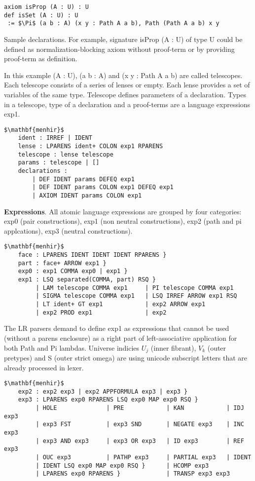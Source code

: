 \documentclass{article}
\theoremstyle{definition}
\begin{document}
\begin{lstlisting}[mathescape=true]
axiom isProp (A : U) : U
def isSet (A : U) : U
 := $\Pi$ (a b : A) (x y : Path A a b), Path (Path A a b) x y
\end{lstlisting}

Sample declarations. For example, signature isProp (A : U) of type U could be
defined as normalization-blocking axiom without proof-term or by providing proof-term as definition.

In this example (A : U), (a b : A) and (x y : Path A a b) are called telescopes.
Each telescope consists of a series of lenses or empty. Each lense provides a
set of variables of the same type. Telescope defines parameters of a declaration.
Types in a telescope, type of a declaration and a proof-terms are a language expressions exp1.

\begin{lstlisting}[mathescape=true]
$\mathbf{menhir}$
    ident : IRREF | IDENT
    lense : LPARENS ident+ COLON exp1 RPARENS
    telescope : lense telescope
    params : telescope | []
    declarations :
        | DEF IDENT params DEFEQ exp1
        | DEF IDENT params COLON exp1 DEFEQ exp1
        | AXIOM IDENT params COLON exp1
\end{lstlisting}

\textbf{Expressions}. All atomic language expressions are grouped by four categories:
exp0 (pair constructions), exp1 (non neutral constructions), exp2 (path and pi applcations),
exp3 (neutral constructions).

\begin{lstlisting}[mathescape=true]
$\mathbf{menhir}$
    face : LPARENS IDENT IDENT IDENT RPARENS }
    part : face+ ARROW exp1 }
    exp0 : exp1 COMMA exp0 | exp1 }
    exp1 : LSQ separated(COMMA, part) RSQ }
         | LAM telescope COMMA exp1     | PI telescope COMMA exp1
         | SIGMA telescope COMMA exp1   | LSQ IRREF ARROW exp1 RSQ
         | LT ident+ GT exp1            | exp2 ARROW exp1
         | exp2 PROD exp1               | exp2
\end{lstlisting}

The LR parsers demand to define exp1 as expressions that cannot be used (without a parens enclosure)
as a right part of left-associative application for both Path and Pi lambdas.
Universe indicies $U_j$ (inner fibrant), $V_k$ (outer pretypes) and S (outer strict omega)
are using unicode subscript letters that are already processed in lexer.

\begin{lstlisting}[mathescape=true]
$\mathbf{menhir}$
    exp2 : exp2 exp3 | exp2 APPFORMULA exp3 | exp3 }
    exp3 : LPARENS exp0 RPARENS LSQ exp0 MAP exp0 RSQ }
         | HOLE              | PRE            | KAN            | IDJ exp3
         | exp3 FST          | exp3 SND       | NEGATE exp3    | INC exp3
         | exp3 AND exp3     | exp3 OR exp3   | ID exp3        | REF exp3
         | OUC exp3          | PATHP exp3     | PARTIAL exp3   | IDENT
         | IDENT LSQ exp0 MAP exp0 RSQ }      | HCOMP exp3
         | LPARENS exp0 RPARENS }             | TRANSP exp3 exp3
\end{lstlisting}
\end{document}
